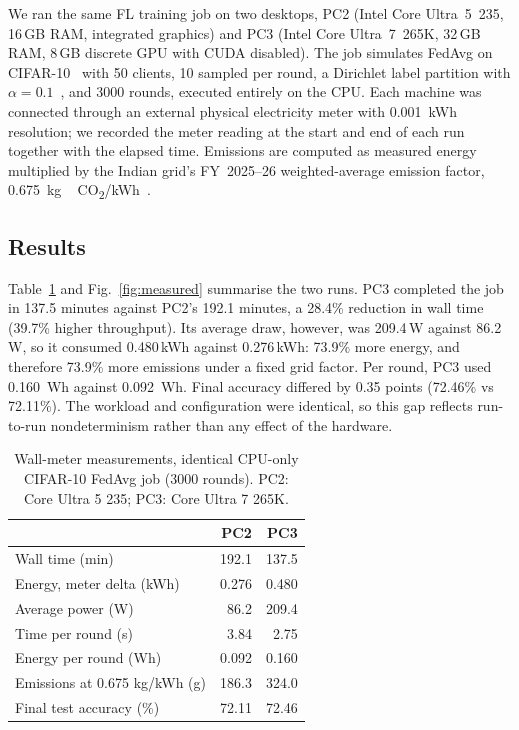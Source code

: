 \documentclass[conference]{IEEEtran}
\begin{document}
We ran the same FL training job on two desktops, PC2 (Intel Core Ultra~5~235, 16\,GB RAM, integrated graphics) and PC3 (Intel Core Ultra~7~265K, 32\,GB RAM, 8\,GB discrete GPU with CUDA disabled). The job simulates FedAvg on CIFAR-10~\cite{krizhevsky2009cifar} with 50 clients, 10 sampled per round, a Dirichlet label partition with $\alpha{=}0.1$~\cite{hsu2019noniid}, and 3000 rounds, executed entirely on the CPU. Each machine was connected through an external physical electricity meter with \SI{0.001}{kWh} resolution; we recorded the meter reading at the start and end of each run together with the elapsed time. Emissions are computed as measured energy multiplied by the Indian grid's FY~2025--26 weighted-average emission factor, \SI{0.675}{kg\,CO_2/kWh}~\cite{cea2026baseline}.

\subsection{Results}

Table~\ref{tab:measured} and Fig.~\ref{fig:measured} summarise the two runs. PC3 completed the job in 137.5 minutes against PC2's 192.1 minutes, a 28.4\% reduction in wall time (39.7\% higher throughput). Its average draw, however, was 209.4\,W against 86.2\,W, so it consumed 0.480\,kWh against 0.276\,kWh: 73.9\% more energy, and therefore 73.9\% more emissions under a fixed grid factor. Per round, PC3 used \SI{0.160}{Wh} against \SI{0.092}{Wh}. Final accuracy differed by 0.35 points (72.46\% vs 72.11\%). The workload and configuration were identical, so this gap reflects run-to-run nondeterminism rather than any effect of the hardware.

\begin{table}[t]
\centering
\caption{Wall-meter measurements, identical CPU-only CIFAR-10 FedAvg job (3000 rounds). PC2: Core Ultra 5 235; PC3: Core Ultra 7 265K.}
\label{tab:measured}
\begin{tabular}{@{}lrr@{}}
\toprule
 & PC2 & PC3 \\
\midrule
Wall time (min) & 192.1 & 137.5 \\
Energy, meter delta (kWh) & 0.276 & 0.480 \\
Average power (W) & 86.2 & 209.4 \\
Time per round (s) & 3.84 & 2.75 \\
Energy per round (Wh) & 0.092 & 0.160 \\
Emissions at 0.675 kg/kWh (g) & 186.3 & 324.0 \\
Final test accuracy (\%) & 72.11 & 72.46 \\
\bottomrule
\end{tabular}
\end{table}
\end{document}
